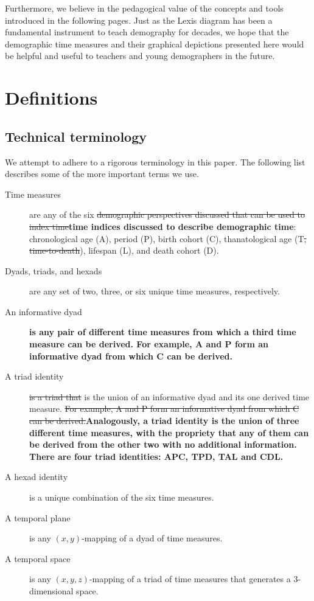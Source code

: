 \documentclass[11pt,oneside,a4paper]{article} %
\begin{document}
Furthermore, we believe in the pedagogical value of the concepts and tools introduced in the following pages. Just as the Lexis diagram has been a fundamental instrument to teach demography for decades, we hope that the demographic time measures and their graphical depictions presented here would be helpful and useful to teachers and young demographers in the future.

\section*{Definitions}
\subsection*{Technical terminology}
We attempt to adhere to a rigorous terminology in this paper. The following list
describes some of the more important terms we use.
\begin{description}
\item[Time measures] are any of the six \sout{demographic perspectives discussed that
can be used to index time}\textbf{time indices discussed to describe demographic time}: chronological age (A), period (P), birth cohort (C), thanatological
age (T\sout{, time-to-death}), lifespan (L), and death cohort (D).
\item[Dyads, triads, and hexads] are any set of two, three, or six unique time
measures, respectively.
\item[An informative dyad]\textbf{ is any pair of different time measures from which a third time measure can be derived. For example, A and P form an informative dyad
from which C can be derived.}
\item[A triad identity] \sout{is a triad that }is the union of an informative dyad and
its one derived time measure. \sout{For example, A and P form an informative dyad
from which C can be derived.}\textbf{Analogously, a triad identity is the union of three different time measures, with the propriety that any of them can be derived from the other two with no additional information. There are four triad identities: APC, TPD, TAL and CDL.}
\item[A hexad identity] is a unique combination of the six time measures.
\item[A temporal plane] is any $(x,y)$-mapping of a dyad of time measures.
\item[A temporal space] is any $(x,y,z)$-mapping of a triad of time
measures that generates a 3-dimensional space.
\end{description}
\end{document}
